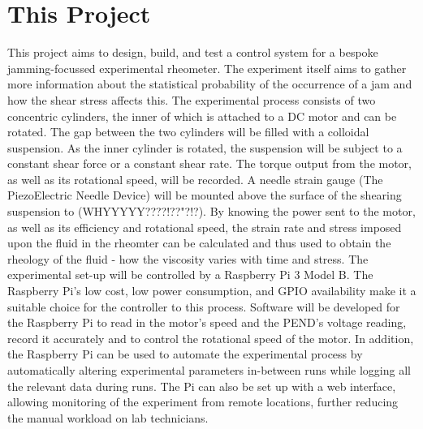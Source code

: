 \documentclass[a4]{report}
\begin{document}
	\section{This Project}
	This project aims to design, build, and test a control system for a bespoke jamming-focussed experimental rheometer. The experiment itself aims to gather more information about the statistical probability of the occurrence of a jam and how the shear stress affects this. 
	The experimental process consists of two concentric cylinders, the inner of which is attached to a DC motor and can be rotated. The gap between the two cylinders will be filled with a colloidal suspension. As the inner cylinder is rotated, the suspension will be subject to a constant shear force or a constant shear rate. The torque output from the motor, as well as its rotational speed, will be recorded. A needle strain gauge (The PiezoElectric Needle Device) will be mounted above the surface of the shearing suspension to (WHYYYYY????!??"?!?). \newline \newline \noindent
	By knowing the power sent to the motor, as well as its efficiency and rotational speed, the strain rate and stress imposed upon the fluid in the rheomter can be calculated and thus used to obtain the rheology of the fluid - how the viscosity varies with time and stress. \newline \newline \noindent
	The experimental set-up will be controlled by a Raspberry Pi 3 Model B. The Raspberry Pi's low cost, low power consumption, and GPIO availability make it a suitable choice for the controller to this process. Software will be developed for the Raspberry Pi to read in the motor's speed and the PEND's voltage reading, record it accurately and to control the rotational speed of the motor. In addition, the Raspberry Pi can be used to automate the experimental process by automatically altering experimental parameters in-between runs while logging all the relevant data during runs. The Pi can also be set up with a web interface, allowing monitoring of the experiment from remote locations, further reducing the manual workload on lab technicians.
\end{document}
